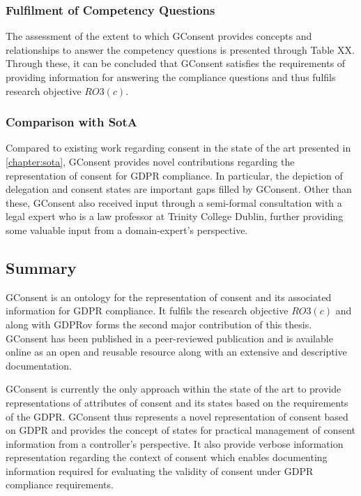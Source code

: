 \subsubsection{Fulfilment of Competency Questions}
The assessment of the extent to which GConsent provides concepts and relationships to answer the competency questions is presented through Table XX. Through these, it can be concluded that GConsent satisfies the requirements of providing information for answering the compliance questions and thus fulfils research objective $RO3(c)$.

\subsubsection{Comparison with SotA}
Compared to existing work regarding consent in the state of the art presented in \autoref{chapter:sota}, GConsent provides novel contributions regarding the representation of consent for GDPR compliance.
In particular, the depiction of delegation and consent states are important gaps filled by GConsent.
Other than these, GConsent also received input through a semi-formal consultation with a legal expert who is a law professor at Trinity College Dublin, further providing some valuable input from a domain-expert's perspective.

\subsection*{Summary}
GConsent is an ontology for the representation of consent and its associated information for GDPR compliance. It fulfils the research objective $RO3(c)$ and along with GDPRov forms the second major contribution of this thesis.
GConsent has been published in a peer-reviewed publication and is available online as an open and reusable resource along with an extensive and descriptive documentation.

GConsent is currently the only approach within the state of the art to provide representations of attributes of consent and its states based on the requirements of the GDPR.
GConsent thus represents a novel representation of consent based on GDPR and provides the concept of states for practical management of consent information from a controller's perspective. It also provide verbose information representation regarding the context of consent which enables documenting information required for evaluating the validity of consent under GDPR compliance requirements.



